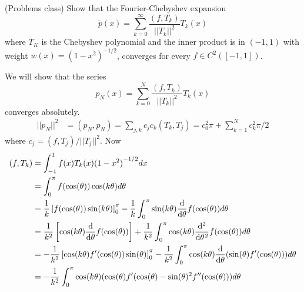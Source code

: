 \begin{example}
	(Problems class) Show that the Fourier-Chebyshev expansion
	\[
		\tilde{p}(x) = \sum_{k = 0}^{\infty} \frac{(f, T_k)}{||T_k||^2} T_k(x)
	\]
	where $T_K$ is the Chebyshev polynomial and the inner product is in $(-1, 1)$ with weight $w(x) = {(1 - x^2)}^{-1/2}$, converges for every $f \in C^2 ([-1, 1])$.

	We will show that the series
	\[
		p_N(x) = \sum_{k = 0}^{N} \frac{(f, T_k)}{||T_k||^2} T_k(x)
	\]
	converges absolutely.
	\[
		\begin{aligned}
			||p_N||^2 & = (p_N, p_N) = \sum_{j, k} c_j c_k (T_k, T_j) = c_0^2 \pi + \sum_{k = 1}^{N} c_k^2 \pi / 2
		\end{aligned}
	\]
	where $c_j = (f, T_j) / ||T_j||^2$. Now
	\[
		\begin{aligned}
			(f, T_k) & = \int_{-1}^{1} f(x) T_k(x) {(1 - x^2)}^{-1/2} dx \\
			& = \int_{0}^{\pi} f(\cos(\theta)) \cos(k\theta) d\theta \\
			& = \frac{1}{k} \left[ f(\cos(\theta)) \sin(k \theta) \right]_{0}^{\pi} - \frac{1}{k} \int_{0}^{\pi} \sin(k \theta) \diff{}{\theta} f(\cos(\theta)) d\theta \\
			& = \frac{1}{k^2} \left[ \cos(k\theta) \diff{}{\theta} f(\cos(\theta)) \right] + \frac{1}{k^2} \int_{0}^{\pi} \cos(k \theta) \diff[2]{}{\theta} f(\cos(\theta)) d\theta \\
			& = -\frac{1}{k^2} \left[ \cos(k\theta) f'(\cos(\theta)) \sin(\theta) \right]_{0}^{\pi} - \frac{1}{k^2} \int_{0}^{\pi} \cos(k \theta) \diff{}{\theta} (\sin(\theta) f'(\cos(\theta))) d\theta \\
			& = -\frac{1}{k^2} \int_{0}^{\pi} \cos(k \theta) (\cos(\theta) f'(\cos(\theta) - \sin(\theta)^2 f''(\cos(\theta))) d\theta
		\end{aligned}
	\]
\end{example}

